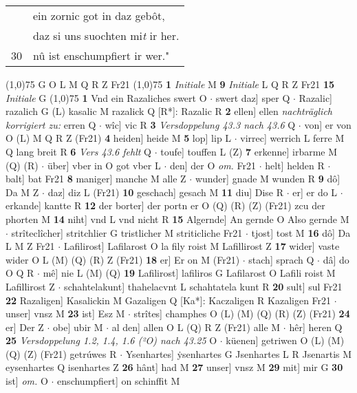 \documentclass[8pt,a4paper,notitlepage]{article}
\begin{document}
\begin{table}[ht]
\begin{minipage}[t]{0.5\linewidth}
\begin{tabular}{rl}
 & ein zornic got in daz gebôt,\\ 
 & daz si uns suochten mi\textit{t} ir her.\\ 
30 & nû ist enschumpfiert ir wer."\\ 
\end{tabular}
\scriptsize
\line(1,0){75} \newline
G O L M Q R Z Fr21 \newline
\line(1,0){75} \newline
\textbf{1} \textit{Initiale} M  \textbf{9} \textit{Initiale} L Q R Z Fr21  \textbf{15} \textit{Initiale} G  \newline
\line(1,0){75} \newline
\textbf{1} Vnd ein Razaliches swert O  $\cdot$ swert daz] sper Q  $\cdot$ Razalic] razalich G (L) kasalic M razalick Q [R*]: Razalic R \textbf{2} ellen] ellen \textit{nachträglich korrigiert zu:} erren Q  $\cdot$ wîc] vic R \textbf{3} \textit{Versdoppelung 43.3 nach 43.6} Q   $\cdot$ von] er von O (L) M Q R Z (Fr21) \textbf{4} heiden] heide M \textbf{5} lop] lip L  $\cdot$ virrec] werrich L ferre M Q lang breit R \textbf{6} \textit{Vers 43.6 fehlt} Q   $\cdot$ toufe] touffen L (Z) \textbf{7} erkenne] irbarme M (Q) (R)  $\cdot$ über] vber in O got vber L  $\cdot$ den] der O \textit{om.} Fr21  $\cdot$ helt] helden R  $\cdot$ balt] bat Fr21 \textbf{8} maniger] manche M alle Z  $\cdot$ wunder] gnade M wunden R \textbf{9} dô] Da M Z  $\cdot$ daz] diz L (Fr21) \textbf{10} geschach] gesach M \textbf{11} diu] Dise R  $\cdot$ er] er do L  $\cdot$ erkande] kantte R \textbf{12} der borter] der portn er O (Q) (R) (Z) (Fr21) zcu der phorten M \textbf{14} niht] vnd L vnd nicht R \textbf{15} Algernde] An gernde O Also gernde M  $\cdot$ strîteclîcher] stritchlier G tristlicher M striticliche Fr21  $\cdot$ tjost] tost M \textbf{16} dô] Da L M Z Fr21  $\cdot$ Lafilirost] Lafilarost O la fily roist M Lafillirost Z \textbf{17} wider] vaste wider O L (M) (Q) (R) Z (Fr21) \textbf{18} er] Er on M (Fr21)  $\cdot$ stach] sprach Q  $\cdot$ dâ] do O Q R  $\cdot$ mê] nie L (M) (Q) \textbf{19} Lafilirost] lafiliros G Lafilarost O Lafili roist M Lafillirost Z  $\cdot$ schahtelakunt] thahelacvnt L schahtatela kunt R \textbf{20} sult] sul Fr21 \textbf{22} Razaligen] Kasalickin M Gazaligen Q [Ka*]: Kaczaligen R Kazaligen Fr21  $\cdot$ unser] vnsz M \textbf{23} ist] Esz M  $\cdot$ strîtes] champhes O (L) (M) (Q) (R) (Z) (Fr21) \textbf{24} er] Der Z  $\cdot$ obe] ubir M  $\cdot$ al den] allen O L (Q) R Z (Fr21) alle M  $\cdot$ hêr] heren Q \textbf{25} \textit{Versdoppelung 1.2, 1.4, 1.6 (²O) nach 43.25} O   $\cdot$ küenen] getriwen O (L) (M) (Q) (Z) (Fr21) getrúwes R  $\cdot$ Ysenhartes] ẏsenhartes G Jsenhartes L R Jsenartis M eysenhartes Q isenhartes Z \textbf{26} hânt] had M \textbf{27} unser] vnsz M \textbf{29} mit] mir G \textbf{30} ist] \textit{om.} O  $\cdot$ enschumpfiert] on schinffit M \newline

\end{minipage}
\end{table}
\end{document}
